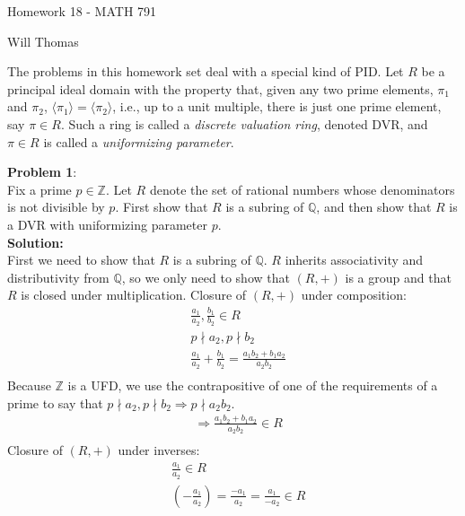 \documentclass[11pt]{article}
\newcommand{\prob}[3]{\begin{flushleft}
        \textbf{Problem #1}: \\
        #2 
		\textbf{Solution:} 
		#3

\end{flushleft}}
\newcommand{\B}[1]{%
	\mathbb{#1}
}
\newcommand{\makeHWtitle}[1]{
    \begin{center}
    \Large{Homework #1 - MATH 791} 
        \vspace{5pt}
        
        \normalsize{Will Thomas}
        \vspace{5pt}
    \end{center}
}
\begin{document}
\makeHWtitle{18}

The problems in this homework set deal with a special kind of PID.
Let $R$ be a principal ideal domain with the property that, given any two prime elements, $\pi_1$ and $\pi_2$, $\langle \pi_1 \rangle = \langle \pi_2 \rangle$, i.e., up to a unit multiple, there is just one prime element, say $\pi \in R$.
Such a ring is called a \emph{discrete valuation ring}, denoted DVR, and $\pi \in R$ is called a \emph{uniformizing parameter}.

\prob{1}{
  Fix a prime $p \in \mathbb{Z}$. Let $R$ denote the set of rational numbers whose denominators is not divisible by $p$.
  First show that $R$ is a subring of $\mathbb{Q}$, and then show that $R$ is a DVR with uniformizing parameter $p$. \\
}{ \\
First we need to show that $R$ is a subring of $\mathbb{Q}$. $R$ inherits associativity and distributivity from $\mathbb{Q}$, so we only need to show that $(R, +)$ is a group and that $R$ is closed under multiplication.
\newline
Closure of $(R, +)$ under composition:
\begin{align*}
&\frac{a_1}{a_2}, \frac{b_1}{b_2} \in R\\
&p \nmid a_2, p \nmid b_2\\
&\frac{a_1}{a_2} + \frac{b_1}{b_2} = \frac{a_1b_2+ b_1a_2}{a_2b_2}\\
\end{align*}
Because $\B{Z}$ is a UFD, we use the contrapositive of one of the requirements of a prime to say that $p \nmid a_2, p \nmid b_2 \Rightarrow p \nmid a_2b_2$.
\begin{align*}
&\Rightarrow \frac{a_1b_2+ b_1a_2}{a_2b_2} \in R\\
\end{align*}
Closure of $(R, +)$ under inverses:
\begin{align*}
&\frac{a_1}{a_2} \in R\\
&\left( - \frac{a_1}{a_2} \right) = \frac{-a_1}{a_2} = \frac{a_1}{-a_2} \in R\\
\end{align*}

}
\end{document}

